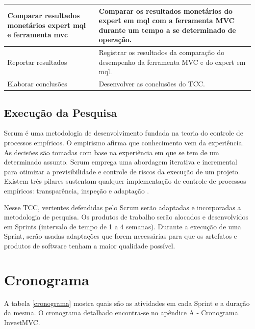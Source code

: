 \begin{table}[htp]
\begin{center}
\begin{tabular}{ | p{5cm} | p{9cm} |}
	Comparar resultados monetários expert mql e ferramenta mvc & Comparar os resultados monetários do expert em mql com a ferramenta MVC durante um tempo a se determinado de operação.\\ \hline
	Reportar resultados & Registrar os resultados da comparação do desempenho da ferramenta MVC e do expert em mql.\\ \hline
	Elaborar conclusões & Desenvolver as conclusões do TCC.\\ \hline
    \end{tabular}
    \end{center}
\label{atividadeMetologia}
\end{table}

\section{Execução da Pesquisa}

Scrum é uma metodologia de desenvolvimento fundada na teoria do controle de processos empíricos. O empirismo afirma que conhecimento vem da experiência. As decisões são tomadas com base na experiência em que se tem de um determinado assunto. Scrum emprega uma abordagem iterativa e incremental para otimizar a previsibilidade e controle de riscos da execução de um projeto. Existem três pilares sustentam qualquer implementação de controle de processos empíricos: transparência, inspeção e adaptação \cite[pág.~4]{schwaber2013}.

Nesse TCC, vertentes defendidas pelo Scrum serão adaptadas e incorporadas a metodologia de pesquisa. Os produtos de  trabalho serão alocados e desenvolvidos em Sprints (intervalo de tempo de 1 a 4 semanas). Durante a execução de uma Sprint, serão usadas adaptações que forem necessárias para que os artefatos e  produtos de software tenham a maior qualidade possível.

\chapter{Cronograma}

A tabela \ref{cronograma} mostra quais são as atividades em cada Sprint e a duração da mesma. O cronograma detalhado encontra-se no apêndice A - Cronograma InvestMVC.

